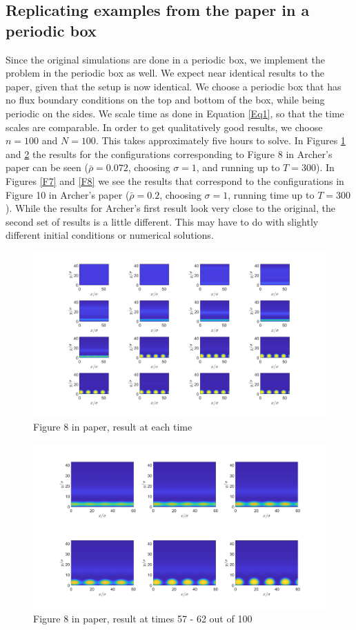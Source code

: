 \documentclass[11pt, a4paper]{article}
\theoremstyle{definition}
\begin{document}
\subsection{Replicating examples from the paper in a periodic box}
Since the original simulations are done in a periodic box, we implement the problem in the periodic box as well. We expect near identical results to the paper, given that the setup is now identical.
We choose a periodic box that has no flux boundary conditions on the top and bottom of the box, while being periodic on the sides. 
We scale time as done in Equation \eqref{Eq1}, so that the time scales are comparable. In order to get qualitatively good results, we choose $n =100$ and $N = 100$. This takes approximately five hours to solve. In Figures \ref{F5} and \ref{F6} the results for the configurations corresponding to Figure 8 in Archer's paper can be seen ($ \bar \rho = 0.072$, choosing $\sigma = 1$, and running up to $T = 300$). In Figures \ref{F7} and \ref{F8} we see the results that correspond to the configurations in Figure 10 in Archer's paper ($ \bar \rho = 0.2$, choosing $\sigma = 1$, running time up to $T = 300$). While the results for Archer's first result look very close to the original, the second set of results is a little different. This may have to do with slightly different initial conditions or numerical solutions.


\begin{figure}[h]
	\centering
	\includegraphics[scale=0.25]{Plotrhobar0072.png}
	\caption{Figure 8 in paper, result at each time} 
	\label{F5}
\end{figure}
\begin{figure}[h]
	\centering
	\includegraphics[scale=0.25]{rhobar0072Zoom57to62.png}
	\caption{Figure 8 in paper, result at times 57 - 62 out of 100} 
	\label{F6}
\end{figure}
\end{document}
